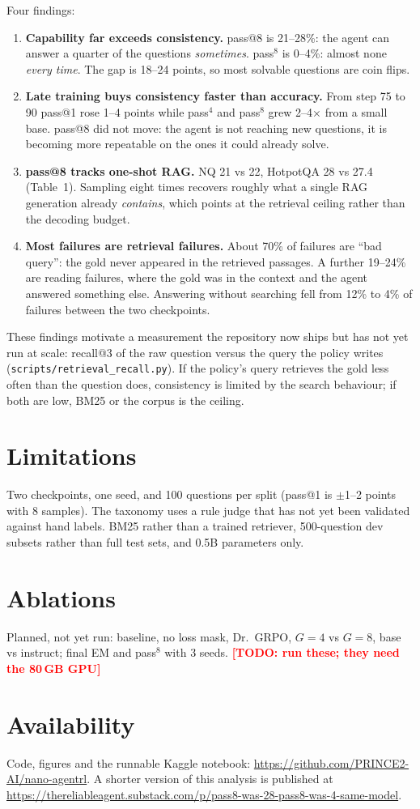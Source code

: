 \documentclass[11pt]{article}
\newcommand{\todo}[1]{\textcolor{red}{\textbf{[TODO: #1]}}}
\begin{document}
Four findings:
\begin{enumerate}
\item \textbf{Capability far exceeds consistency.} pass@8 is 21--28\%: the agent can answer a
quarter of the questions \emph{sometimes}. pass$^8$ is 0--4\%: almost none \emph{every time}.
The gap is 18--24 points, so most solvable questions are coin flips.
\item \textbf{Late training buys consistency faster than accuracy.} From step 75 to 90 pass@1
rose 1--4 points while pass$^4$ and pass$^8$ grew 2--4$\times$ from a small base. pass@8 did
not move: the agent is not reaching new questions, it is becoming more repeatable on the ones
it could already solve.
\item \textbf{pass@8 tracks one-shot RAG.} NQ 21 vs 22, HotpotQA 28 vs 27.4 (Table~1). Sampling
eight times recovers roughly what a single RAG generation already \emph{contains}, which points
at the retrieval ceiling rather than the decoding budget.
\item \textbf{Most failures are retrieval failures.} About 70\% of failures are ``bad query'':
the gold never appeared in the retrieved passages. A further 19--24\% are reading failures,
where the gold was in the context and the agent answered something else. Answering without
searching fell from 12\% to 4\% of failures between the two checkpoints.
\end{enumerate}

These findings motivate a measurement the repository now ships but has not yet run at scale:
recall@3 of the raw question versus the query the policy writes
(\texttt{scripts/retrieval\_recall.py}). If the policy's query retrieves the gold less often
than the question does, consistency is limited by the search behaviour; if both are low, BM25
or the corpus is the ceiling.

\section{Limitations}
Two checkpoints, one seed, and 100 questions per split (pass@1 is $\pm$1--2 points with 8
samples). The taxonomy uses a rule judge that has not yet been validated against hand labels.
BM25 rather than a trained retriever, 500-question dev subsets rather than full test sets, and
0.5B parameters only.

\section{Ablations}
Planned, not yet run: baseline, no loss mask, Dr.~GRPO, $G=4$ vs $G=8$, base vs instruct;
final EM and pass$^8$ with 3 seeds. \todo{run these; they need the 80\,GB GPU}

\section*{Availability}
Code, figures and the runnable Kaggle notebook:
\url{https://github.com/PRINCE2-AI/nano-agentrl}. A shorter version of this analysis is
published at
\url{https://thereliableagent.substack.com/p/pass8-was-28-pass8-was-4-same-model}.



\end{document}
